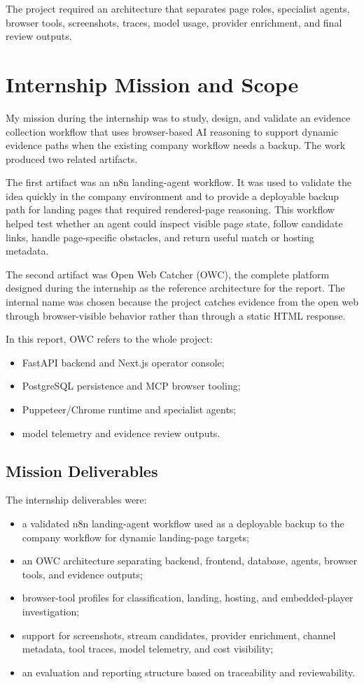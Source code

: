 The project required an architecture that separates page roles, specialist
agents, browser tools, screenshots, traces, model usage, provider enrichment, and final
review outputs.

\section{Internship Mission and Scope}

My mission during the internship was to study, design, and validate an evidence
collection workflow that uses browser-based AI reasoning to support dynamic evidence
paths when the existing company workflow needs a backup. The work produced two related
artifacts.

The first artifact was an n8n landing-agent workflow. It was used to validate the idea
quickly in the company environment and to provide a deployable backup path for landing
pages that required rendered-page reasoning. This workflow helped test whether an agent
could inspect visible page state, follow candidate links, handle page-specific
obstacles, and return useful match or hosting metadata.

The second artifact was Open Web Catcher (OWC), the complete platform designed during
the internship as the reference architecture for the report. The internal name was
chosen because the project catches evidence from the open web through browser-visible
behavior rather than through a static HTML response.

In this report, OWC refers to the whole project:
\begin{itemize}
  \item FastAPI backend and Next.js operator console;
  \item PostgreSQL persistence and MCP browser tooling;
  \item Puppeteer/Chrome runtime and specialist agents;
  \item model telemetry and evidence review outputs.
\end{itemize}

\subsection{Mission Deliverables}

The internship deliverables were:

\begin{itemize}
  \item a validated n8n landing-agent workflow used as a deployable backup to the
  company workflow for dynamic landing-page targets;
  \item an OWC architecture separating backend, frontend, database, agents, browser
  tools, and evidence outputs;
  \item browser-tool profiles for classification, landing, hosting, and embedded-player
  investigation;
  \item support for screenshots, stream candidates, provider enrichment, channel
  metadata, tool traces, model telemetry, and cost visibility;
  \item an evaluation and reporting structure based on traceability and reviewability.
\end{itemize}

